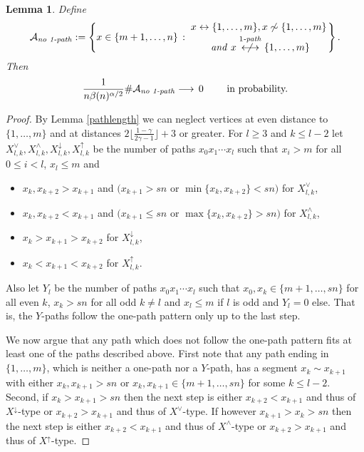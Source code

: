 \documentclass[12pt,a4paper]{article}
\numberwithin{equation}{section}
\newtheorem{lemma}[shared]{Lemma}
\begin{document}
\begin{lemma}\label{compofm}
Define 
$$\mathcal A_{\text{\emph{no 1-path}}}:=\Bigg\{x\in\{m+1,\dots,n\}\,:\,{ x\leftrightarrow\{1,\dots,m\}, x\not\sim\{1,\dots,m\}\atop \text{ \emph{and} }x\overset{1\text{\emph{-path}}}{\centernot\longleftrightarrow}\{1,\dots,m\}}\Bigg\}\,.$$
Then 
    \begin{align*}
        \frac{1}{n\beta(n)^{\alpha/2}}\#\mathcal A_{\text{\emph{no 1-path}}}
        \longrightarrow \,
        0\qquad \text{ in probability.}
    \end{align*}
\end{lemma}
\begin{proof}
    By Lemma \ref{pathlength} we can neglect vertices at even distance to $\{1,\ldots,m\}$ and at  distances $2\big\lfloor\tfrac{1-\gamma}{2\gamma-1}\big\rfloor+3$
    or greater. 
    For $l\ge 3 $ and $k\leq l-2$ let $X_{l,k}^{\vee},X_{l,k}^{\wedge},X_{l,k}^{\downarrow},X_{l,k}^{\uparrow}$ be the number of paths $x_0x_1\cdots x_l$ such that $x_i>m$ for all $0\leq i<l$, 
    $x_l\le m $ and 
    \begin{itemize}
        \item %
        $x_k, x_{k+2}>x_{k+1}$ 
        and $\big(x_{k+1}>sn$ or $\min\{x_k,x_{k+2}\}<sn\big)$ for $X_{l,k}^{\vee}$,
        \item %
        $x_k, x_{k+2}<x_{k+1}$ 
        and $\big(x_{k+1}\le sn$ or $\max\{x_k,x_{k+2}\}>sn\big)$ for $X_{l,k}^{\wedge}$,
        \item $x_k>x_{k+1}>x_{k+2}$ for $X_{l,k}^{\downarrow}$,
        \item $x_k<x_{k+1}<x_{k+2}$ for $X_{l,k}^{\uparrow}$.
    \end{itemize}
    Also let $Y_l$ be the number of paths $x_0x_1\cdots x_l$ such that $x_0,x_k\in\{m+1,\dots,sn\}$ for all even $k$, $x_k>sn$ for all odd $k\neq l$ and $x_l\le m$ if $l$ is odd and $Y_l=0$ else. That is, the $Y$-paths follow the one-path pattern only up to the last step.\medskip 
    
   We now argue that any path which does not follow the one-path pattern fits at least one of the paths described above. First note that any path ending in $\{1,\ldots,m\}$, which is neither a one-path nor a $Y$-path, has a segment $x_k\sim x_{k+1}$ with either  $x_k,x_{k+1}>sn$ or $x_k,x_{k+1}\in\{m+1,\dots,sn\}$ for some $k\le l-2$. Second, if $x_k>x_{k+1}>sn$ then the next step is either $x_{k+2}<x_{k+1}$ and thus of $X^{\downarrow}$-type or $x_{k+2}>x_{k+1}$ and thus of $X^{\vee}$-type. If however $x_{k+1}>x_k>sn$ then the next step is either $x_{k+2}<x_{k+1}$ and thus of $X^{\wedge}$-type or $x_{k+2}>x_{k+1}$ and thus of $X^{\uparrow}$-type. 
    \smallskip 
    

\end{proof}
\end{document}
